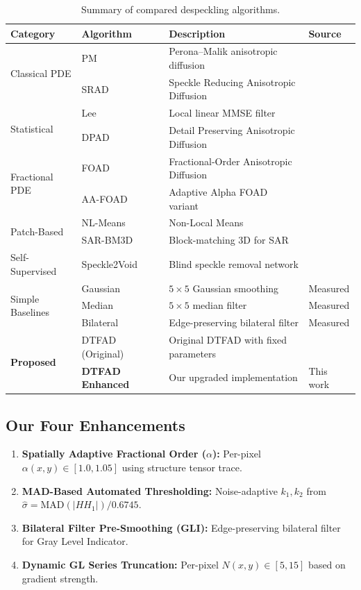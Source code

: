 \documentclass[12pt,a4paper]{article}
\begin{document}
\begin{table}[H]
\centering
\caption{Summary of compared despeckling algorithms.}
\label{tab:algorithms}
\small
\begin{tabular}{llp{6.5cm}l}
\toprule
\textbf{Category} & \textbf{Algorithm} & \textbf{Description} & \textbf{Source} \\
\midrule
\multirow{2}{*}{Classical PDE} 
  & PM & Perona--Malik anisotropic diffusion & \cite{perona1990} \\
  & SRAD & Speckle Reducing Anisotropic Diffusion & \cite{yu2002srad} \\
\midrule
\multirow{2}{*}{Statistical}
  & Lee & Local linear MMSE filter & \cite{lee1980} \\
  & DPAD & Detail Preserving Anisotropic Diffusion & \cite{aja2006dpad} \\
\midrule
\multirow{2}{*}{Fractional PDE}
  & FOAD & Fractional-Order Anisotropic Diffusion & \cite{bai2007foad} \\
  & AA-FOAD & Adaptive Alpha FOAD variant & \cite{bai2007foad} \\
\midrule
\multirow{2}{*}{Patch-Based}
  & NL-Means & Non-Local Means & \cite{buades2005nlm} \\
  & SAR-BM3D & Block-matching 3D for SAR & \cite{parrilli2012sarbm3d} \\
\midrule
Self-Supervised & Speckle2Void & Blind speckle removal network & \cite{molini2020s2v} \\
\midrule
\multirow{3}{*}{Simple Baselines}
  & Gaussian & $5 \times 5$ Gaussian smoothing & Measured \\
  & Median & $5 \times 5$ median filter & Measured \\
  & Bilateral & Edge-preserving bilateral filter & Measured \\
\midrule
\multirow{2}{*}{\textbf{Proposed}}
  & DTFAD (Original) & Original DTFAD with fixed parameters & \cite{wei2025dtfad} \\
  & \textbf{DTFAD Enhanced} & Our upgraded implementation & This work \\
\bottomrule
\end{tabular}
\end{table}

\subsection{Our Four Enhancements}

\begin{enumerate}[label=\textbf{Task \Alph*:}]
\item \textbf{Spatially Adaptive Fractional Order ($\alpha$):} Per-pixel $\alpha(x,y) \in [1.0, 1.05]$ using structure tensor trace.
\item \textbf{MAD-Based Automated Thresholding:} Noise-adaptive $k_1, k_2$ from $\hat{\sigma} = \text{MAD}(|HH_1|)/0.6745$.
\item \textbf{Bilateral Filter Pre-Smoothing (GLI):} Edge-preserving bilateral filter for Gray Level Indicator.
\item \textbf{Dynamic GL Series Truncation:} Per-pixel $N(x,y) \in [5, 15]$ based on gradient strength.
\end{enumerate}
\end{document}
